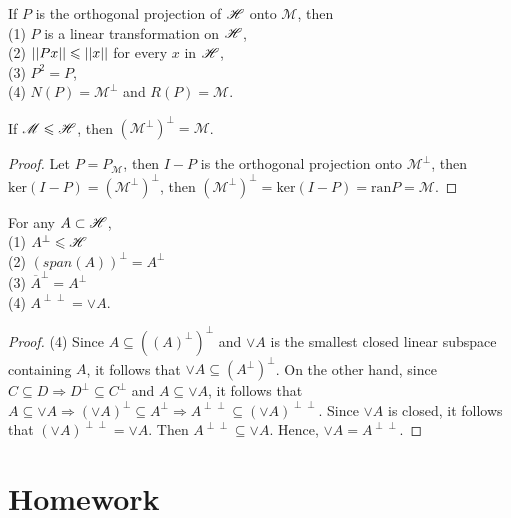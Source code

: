 \begin{theorem}{}{}
    If $P$ is the orthogonal projection of $\mathscr{H}$ onto $\mathscr{M}$, then\\
    (1) $P$ is a linear transformation on $\mathscr{H}$,\\
    (2) $||Px||\leqslant ||x||$ for every $x$ in $\mathscr{H}$,\\
    (3) $P^2=P$,\\
    (4) $N(P) = \mathscr{M}^{\perp}$ and $R(P)=\mathscr{M}$.
\end{theorem}

\begin{corollary}{}{}
    If $\mathscr{M}\leqslant \mathscr{H}$, then $(\mathscr{M}^{\perp})^{\perp}=\mathscr{M}$. 
\end{corollary}

\begin{proof}
    Let $P=P_{\mathscr{M}}$, then $I-P$ is the orthogonal projection onto $\mathscr{M}^{\perp}$,
    then $\text{ker}(I-P)=(\mathscr{M}^{\perp})^{\perp}$, then $(\mathscr{M}^{\perp})^{\perp}=\text{ker}(I-P)=\text{ran}P=\mathscr{M}$.
\end{proof}

\begin{proposition}{}{}
    For any $A\subset \mathscr{H}$,\\
    (1) $A^{\perp}\leqslant\mathscr{H}$\\
    (2) $(span(A))^{\perp}=A^{\perp}$\\
    (3) $\overline{A}^{\perp} = A^{\perp}$\\    
    (4) $A^{\perp\perp}=\vee A$.
\end{proposition}

\begin{proof}
    (4) Since $A\subseteq ((A)^{\perp})^{\perp}$ and $\vee A$ is the smallest closed linear subspace containing $A$,
    it follows that $\vee A\subseteq (A^{\perp})^{\perp}$. On the other hand, 
    since $C\subseteq D\Rightarrow D^{\perp}\subseteq C^{\perp}$ and $A\subseteq \vee A$, 
    it follows that $A\subseteq \vee A\Rightarrow (\vee A)^{\perp}\subseteq A^{\perp}\Rightarrow A^{\perp\perp}\subseteq (\vee A)^{\perp\perp}$.
    Since $\vee A$ is closed, it follows that $(\vee A)^{\perp\perp}=\vee A$. Then $A^{\perp\perp}\subseteq \vee A$.
    Hence, $\vee A=A ^{\perp\perp}$.
\end{proof}

\section{Homework}

